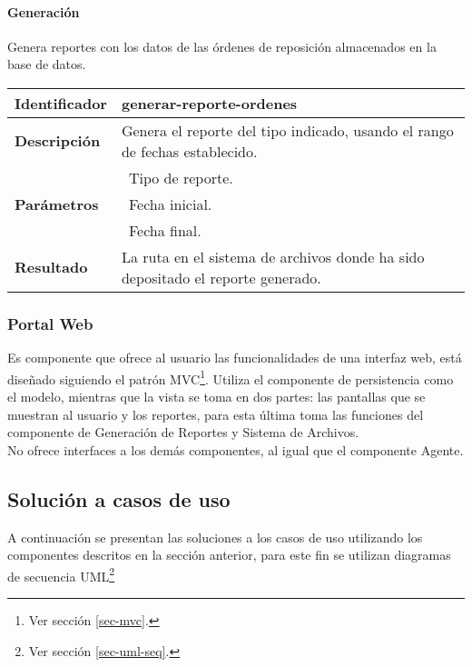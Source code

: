 \paragraph{Generación\\} Genera reportes con los datos de las órdenes de reposición almacenados en la base de datos.

	\begin{longtable}{|p{}|p{}|}
		\hline
		\textbf{Identificador}	& \textbf{generar-reporte-ordenes}\\
		\hline
		\hline
		\textbf{Descripción}	& Genera el reporte del tipo indicado, usando el rango de fechas establecido.\\
		\hline
		\multirow{3}{*}{\textbf{Parámetros}}	& \textbullet\, Tipo de reporte.\\
												& \textbullet\, Fecha inicial.\\
												& \textbullet\, Fecha final.\\
		\hline
		\textbf{Resultado}		& La ruta en el sistema de archivos donde ha sido depositado el reporte generado.\\
		\hline
	\end{longtable}

\subsubsection{Portal Web}
Es componente que ofrece al usuario las funcionalidades de una interfaz web, está diseñado siguiendo el patrón MVC\footnote{Ver sección \ref{sec-mvc}.}. Utiliza el componente de persistencia como el modelo, mientras que la vista se toma en dos partes: las pantallas que se muestran al usuario y los reportes, para esta última toma las funciones del componente de Generación de Reportes y Sistema de Archivos.\\
No ofrece interfaces a los demás componentes, al igual que el componente Agente.



\subsection{Solución a casos de uso}
A continuación se presentan las soluciones a los casos de uso utilizando los componentes descritos en la sección anterior, para este fin se utilizan diagramas de secuencia UML\footnote{Ver sección \ref{sec-uml-seq}.}

